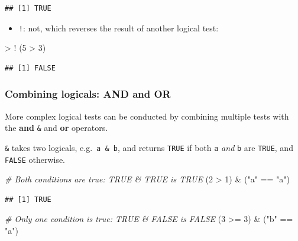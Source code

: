 \documentclass[
]{book}
\newenvironment{Shaded}{\begin{snugshade}}{\end{snugshade}}
\newcommand{\CommentTok}[1]{\textcolor[rgb]{0.56,0.35,0.01}{\textit{#1}}}
\newcommand{\DecValTok}[1]{\textcolor[rgb]{0.00,0.00,0.81}{#1}}
\newcommand{\NormalTok}[1]{#1}
\newcommand{\SpecialCharTok}[1]{\textcolor[rgb]{0.00,0.00,0.00}{#1}}
\newcommand{\StringTok}[1]{\textcolor[rgb]{0.31,0.60,0.02}{#1}}
\providecommand{\tightlist}{%
  \setlength{\itemsep}{0pt}\setlength{\parskip}{0pt}}
\begin{document}
\begin{verbatim}
## [1] TRUE
\end{verbatim}

\begin{itemize}
\tightlist
\item
  \texttt{!}: not, which reverses the result of another logical test:
\end{itemize}

\begin{Shaded}
\begin{Highlighting}[]
\SpecialCharTok{\textgreater{}} \SpecialCharTok{!}\NormalTok{ (}\DecValTok{5} \SpecialCharTok{\textgreater{}} \DecValTok{3}\NormalTok{)}
\end{Highlighting}
\end{Shaded}

\begin{verbatim}
## [1] FALSE
\end{verbatim}

\hypertarget{combining-logicals-and-and-or}{%
\subsubsection{Combining logicals: AND and OR}\label{combining-logicals-and-and-or}}

More complex logical tests can be conducted by combining multiple tests
with the \textbf{and} \texttt{\&} and \textbf{or} \texttt{\textbar{}} operators.

\texttt{\&} takes two logicals, e.g.~\texttt{a\ \&\ b}, and returns \texttt{TRUE} if both \texttt{a} \emph{and} \texttt{b}
are \texttt{TRUE}, and \texttt{FALSE} otherwise.

\begin{Shaded}
\begin{Highlighting}[]
\CommentTok{\# Both conditions are true: TRUE \& TRUE is TRUE}
\NormalTok{(}\DecValTok{2} \SpecialCharTok{\textgreater{}} \DecValTok{1}\NormalTok{) }\SpecialCharTok{\&}\NormalTok{ (}\StringTok{"a"} \SpecialCharTok{==} \StringTok{"a"}\NormalTok{)}
\end{Highlighting}
\end{Shaded}

\begin{verbatim}
## [1] TRUE
\end{verbatim}

\begin{Shaded}
\begin{Highlighting}[]
\CommentTok{\# Only one condition is true: TRUE \& FALSE is FALSE}
\NormalTok{(}\DecValTok{3} \SpecialCharTok{\textgreater{}=} \DecValTok{3}\NormalTok{) }\SpecialCharTok{\&}\NormalTok{ (}\StringTok{"b"} \SpecialCharTok{==} \StringTok{"a"}\NormalTok{)}
\end{Highlighting}
\end{Shaded}
\end{document}
